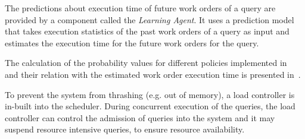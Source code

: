The predictions about execution time of future work orders of a query are provided by a component called the \textit{Learning Agent}.
It uses a prediction model that takes execution statistics of the past work orders of a query as input and estimates the execution time for the future work orders for the query.

The calculation of the probability values for different policies implemented in \Quickstep\, and their relation with the estimated work order execution time is presented in~\cite{DBLP:conf/bigdata/DeshmukhMP17}.

To prevent the system from thrashing (e.g. out of memory), a load controller is in-built into the scheduler.
During concurrent execution of the queries, the load controller can control the admission of queries into the system and it may suspend resource intensive queries, to ensure resource availability.

